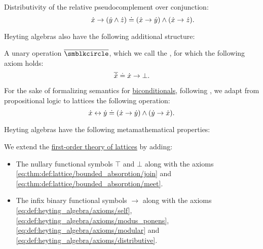 \begin{definition}
\begin{thmenum}[series=def:heyting_algebra]
\begin{thmenum}
       Distributivity of the relative pseudocomplement over conjunction:
      \begin{equation}\label{eq:def:heyting_algebra/axioms/distributive}
        \mathllap{\synx \rightarrow (\syny \wedge \synz)} \syneq \mathrlap{(\synx \rightarrow \syny) \wedge (\synx \rightarrow \synz).}
      \end{equation}
    \end{thmenum}
  \end{thmenum}

  Heyting algebras also have the following additional structure:
  \begin{thmenum}[resume=def:heyting_algebra]
     A unary operation \( {\oline {\anon}} \), which we call the , for which the following axiom holds:
    \begin{equation}\label{eq:def:heyting_algebra/pseudocomplement}
      \oline \synx \syneq \synx \rightarrow \bot.
    \end{equation}

    \mimprovised For the sake of formalizing semantics for \hyperref[def:propositional_alphabet/connectives/biconditional]{biconditionals}, following , we adapt from propositional logic to lattices the following operation:
    \begin{equation}\label{eq:def:heyting_algebra/biconditional}
      {\dot{x}} \leftrightarrow {\dot{y}} \doteq ({\dot{x}} \rightarrow {\dot{y}}) \wedge ({\dot{y}} \rightarrow {\dot{x}}).
    \end{equation}
  \end{thmenum}

  Heyting algebras have the following metamathematical properties:
  \begin{thmenum}[resume=def:heyting_algebra]
     We extend the \hyperref[def:lattice/theory]{first-order theory of lattices} by adding:
    \begin{itemize}
      \item The nullary functional symbols \( \top \) and \( \bot \) along with the axioms \eqref{eq:thm:def:lattice/bounded_absorption/join} and \eqref{eq:thm:def:lattice/bounded_absorption/meet}.

      \item The infix binary functional symbols \( \rightarrow \) along with the axioms \eqref{eq:def:heyting_algebra/axioms/self}, \eqref{eq:def:heyting_algebra/axioms/modus_ponens}, \eqref{eq:def:heyting_algebra/axioms/modular} and \eqref{eq:def:heyting_algebra/axioms/distributive}.


\end{itemize}
\end{thmenum}
\end{definition}
